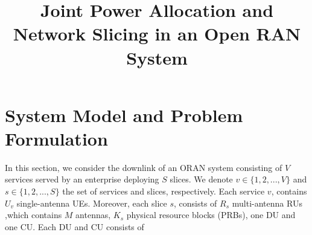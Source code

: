 \documentclass[conference]{IEEEtran}
\begin{document}
\title{Joint Power Allocation and Network Slicing in an Open RAN System \vspace{-.1cm}
}
%
  \author{
  }

\maketitle

\begin{abstract}

\end{abstract}

\begin{IEEEkeywords}

\end{IEEEkeywords}

\section{System Model and Problem Formulation}\label{systemmodel}
In this section, we consider the downlink of an ORAN system consisting of $V$ services served by an enterprise deploying $S$ slices. We denote $v\in \{1,2,...,V \} $ and $s \in \{1,2,...,S \}$ the set of
services and slices, respectively. Each service $v$, contains $U_v$ single-antenna UEs. Moreover, each slice $s$, consists of $R_s$ multi-antenna RUs ,which contains $M$ antennas, $K_s$ physical resource blocks (PRBs), one DU and one CU. Each DU and CU consists of $$  





\end{document}
